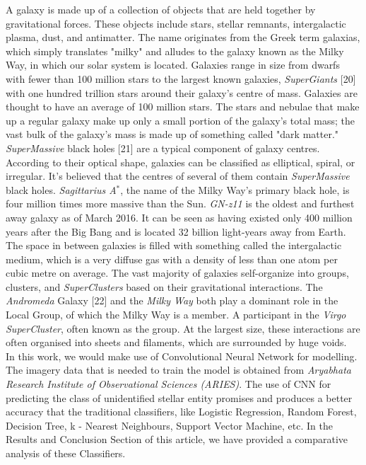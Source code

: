 \documentclass[conference]{IEEEtran}
\begin{document}
A galaxy is made up of a collection of objects that are held together by gravitational forces. These objects include stars, stellar remnants, intergalactic plasma, dust, and antimatter. The name originates from the Greek term galaxias, which simply translates "milky" and alludes to the galaxy known as the Milky Way, in which our solar system is located. Galaxies range in size from dwarfs with fewer than 100 million stars to the largest known galaxies, \textit{SuperGiants} [20] with one hundred trillion stars around their galaxy's centre of mass. Galaxies are thought to have an average of 100 million stars. The stars and nebulae that make up a regular galaxy make up only a small portion of the galaxy's total mass; the vast bulk of the galaxy's mass is made up of something called "dark matter." \textit{SuperMassive} black holes [21] are a typical component of galaxy centres. According to their optical shape, galaxies can be classified as elliptical, spiral, or irregular. It's believed that the centres of several of them contain \textit{SuperMassive} black holes. \textit{Sagittarius A$^*$}, the name of the Milky Way's primary black hole, is four million times more massive than the Sun. \textit{GN-z11} is the oldest and furthest away galaxy as of March 2016. It can be seen as having existed only 400 million years after the Big Bang and is located 32 billion light-years away from Earth. The space in between galaxies is filled with something called the intergalactic medium, which is a very diffuse gas with a density of less than one atom per cubic metre on average. The vast majority of galaxies self-organize into groups, clusters, and \textit{SuperClusters} based on their gravitational interactions. The \textit{Andromeda} Galaxy [22] and the \textit{Milky Way} both play a dominant role in the Local Group, of which the Milky Way is a member. A participant in the \textit{Virgo SuperCluster}, often known as the group. At the largest size, these interactions are often organised into sheets and filaments, which are surrounded by huge voids. \\

In this work, we would make use of Convolutional Neural Network for modelling. The imagery data that is needed to train the model is obtained from \textit{Aryabhata Research Institute of Observational Sciences (ARIES)}. The use of CNN for predicting the class of unidentified stellar entity promises and produces a better accuracy that the traditional classifiers, like Logistic Regression, Random Forest, Decision Tree, k - Nearest Neighbours, Support Vector Machine, etc. In the Results and Conclusion Section of this article, we have provided a comparative analysis of these Classifiers. 
\end{document}
